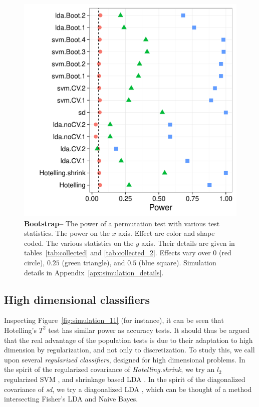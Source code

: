 \documentclass[12pt,a4paper]{article}
\theoremstyle{definition}
\begin{document}
\begin{figure}[ht]
\centering
	  \includegraphics[width=0.7\linewidth]{"art/2016-08-09 20:09:20"}
	  \caption{
		  \textbf{Bootstrap--}
		  The power of a permutation test with various test statistics. 
		  The power on the $x$ axis. 
		  Effect are color and shape coded. 
		  The various statistics on the $y$ axis. 
		  Their details are given in tables~\ref{tab:collected} and \ref{tab:collected_2}. 
		  Effects vary over $0$ (red circle), $0.25$ (green triangle), and $0.5$ (blue square). 
		  Simulation details in Appendix~\ref{apx:simulation_details}.
		  } 
	\label{fig:bootstrap}
\end{figure}


\subsection{High dimensional classifiers}
\label{sec:highdim}
Inspecting Figure~\ref{fig:simulation_11} (for instance), it can be seen that Hotelling's $T^2$ test has similar power as accuracy tests. 
It should thus be argued that the real advantage of the population tests is due to their adaptation to high dimension by regularization, and not only to discretization.
To study this, we call upon several \emph{regularized classifiers}, designed for high dimensional problems. 
In the spirit of the regularized covariance of \emph{Hotelling.shrink}, we try an $l_2$ regularized SVM \cite{friedman_regularization_2010}, and shrinkage based LDA \citep{pang_shrinkage-based_2009,ramey_high-dimensional_2016}. %
In the spirit of the diagonalized covariance of \emph{sd}, we try a diagonalized LDA \citep{dudoit_comparison_2002}, which can be thought of a method intersecting Fisher's LDA and Naive Bayes. 
\end{document}
